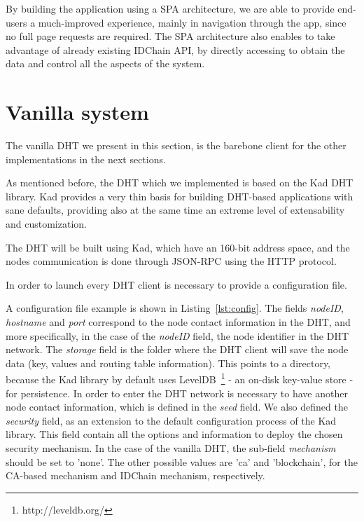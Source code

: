 By building the application using a SPA architecture, we are able to provide end-users a much-improved experience, mainly in navigation through the app, since no full page requests are required.
The \ac{SPA} architecture also enables to take advantage of already existing IDChain API, by directly accessing to obtain the data and control all the aspects of the system.

\section{Vanilla system}

The vanilla \ac{DHT} we present in this section, is the barebone client for the other implementations in the next sections.

As mentioned before, the \ac{DHT} which we implemented is based on the Kad DHT library.
Kad provides a very thin basis for building DHT-based applications with sane defaults, providing also at the same time an extreme level of extensability and customization.

The DHT will be built using Kad, which have an 160-bit address space, and the nodes communication is done through JSON-RPC using the \ac{HTTP} protocol.

In order to launch every DHT client is necessary to provide a configuration file.



A configuration file example is shown in Listing~\ref{lst:config}.
The fields \textit{nodeID}, \textit{hostname} and \textit{port} correspond to the node contact information in the DHT, and more specifically, in the case of the \textit{nodeID} field, the node identifier in the DHT network.
The \textit{storage} field is the folder where the DHT client will save the node data (key, values and routing table information). This points to a directory, because the Kad library by default uses LevelDB~\footnote{http://leveldb.org/} - an on-disk key-value store - for persistence.
In order to enter the DHT network is necessary to have another node contact information, which is defined in the \textit{seed} field.
We also defined the \textit{security} field, as an extension to the default configuration process of the Kad library.
This field contain all the options and information to deploy the chosen security mechanism.
In the case of the vanilla DHT, the sub-field \textit{mechanism} should be set to 'none'.
The other possible values are 'ca' and 'blockchain', for the CA-based mechanism and IDChain mechanism, respectively.

